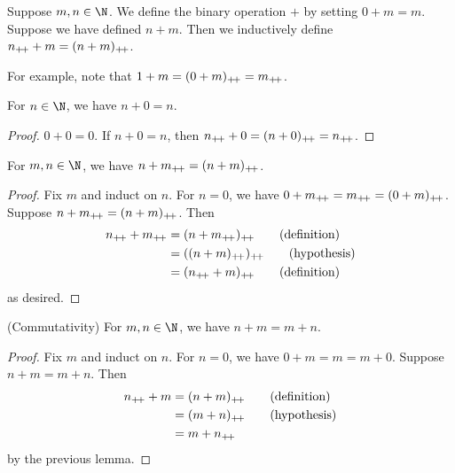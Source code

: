 
\begin{definition}[Addition] \label{def:N:addition}
    Suppose $m, n \in \N$.
    We define the binary operation $+$ by setting $0 + m = m$.
    Suppose we have defined $n + m$.
    Then we inductively define $n_{+\!+} + m = (n + m)_{+\!+}$.
\end{definition}
For example, note that $1 + m = (0 + m)_{+\!+} = m_{+\!+}$.

\begin{lemma} \label{thm:N:add_zero}
    For $n \in \N$, we have $n + 0 = n$.
\end{lemma}
\begin{proof}
    $0 + 0 = 0$.
    If $n + 0 = n$, then $n_{+\!+} + 0 = (n + 0)_{+\!+} = n_{+\!+}$.
\end{proof}

\begin{lemma} \label{thm:N:add_successor}
    For $m, n \in \N$, we have $n + m_{+\!+} = (n + m)_{+\!+}$.
\end{lemma}
\begin{proof}
    Fix $m$ and induct on $n$.
    For $n = 0$, we have $0 + m_{+\!+} = m_{+\!+} = (0 + m)_{+\!+}$.
    Suppose $n + m_{+\!+} = (n + m)_{+\!+}$.
    Then \begin{align*}
        n\pp + m\pp &= (n + m\pp)\pp \tag{definition} \\
                    &= ((n + m)\pp)\pp \tag{hypothesis} \\
                    &= (n\pp + m)\pp \tag{definition}
    \end{align*}
    as desired.
\end{proof}

\begin{problem} \label{prb:N:add_commute}
    (Commutativity) For $m, n \in \N$, we have $n + m = m + n$.
\end{problem}
\begin{proof}
    Fix $m$ and induct on $n$.
    For $n = 0$, we have $0 + m = m = m + 0$.
    Suppose $n + m = m + n$.
    Then \begin{align*}
        n_{+\!+} + m &= (n + m)_{+\!+} \tag{definition} \\
                 &= (m + n)_{+\!+} \tag{hypothesis} \\
                 &= m + n_{+\!+}
    \end{align*}
    by the previous lemma.
\end{proof}

